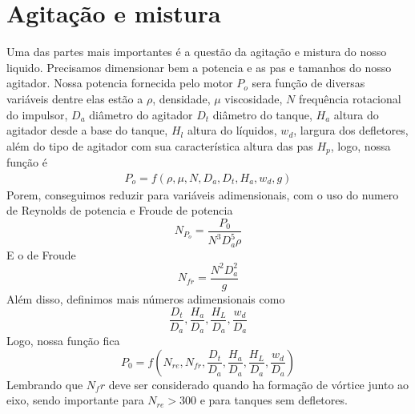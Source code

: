 \section{Agitação e mistura}
Uma  das partes mais importantes é a questão da agitação e mistura do nosso liquido. Precisamos
dimensionar bem a potencia e as pas e tamanhos do nosso agitador. Nossa potencia fornecida pelo
motor \(P_o\) sera função de diversas variáveis dentre elas estão a \(\rho\), densidade, \(\mu\)
viscosidade, \(N\) frequência rotacional do impulsor, \(D_a\) diâmetro do agitador \(D_t\) diâmetro
do tanque, \(H_a\) altura do agitador desde a base do tanque, \(H_l\) altura do líquidos, \(w_d\),
largura dos defletores, além do tipo de agitador com sua característica altura das pas \(H_p\),
logo, nossa função é
\begin{align}
    P_o = f(\rho, \mu, N, D_a, D_t, H_a, w_d, g)
\end{align}
Porem, conseguimos reduzir para variáveis adimensionais, com o uso do numero de Reynolds de potencia
e Froude de potencia
\begin{equation}
    N_{P_o} = \frac{P_0}{N^3D_a^5 \rho}
\end{equation}
E o de Froude
\begin{equation}
    N_{fr} = \frac{N^2D_a^2}{g}
\end{equation}
Além disso, definimos mais números adimensionais como 
\begin{equation}
    \frac{D_t}{D_a}, \frac{H_a}{D_a}, \frac{H_L}{D_a}, \frac{w_d}{D_a}
\end{equation}
Logo, nossa função fica
\begin{equation}
    P_0 = f(N_{re}, N_{fr}, \frac{D_t}{D_a}, \frac{H_a}{D_a}, \frac{H_L}{D_a}, \frac{w_d}{D_a})
\end{equation}
Lembrando que \(N_fr\) deve ser considerado quando ha formação de vórtice junto ao eixo, sendo
importante para \(N_{re} > 300\) e para tanques sem defletores.
